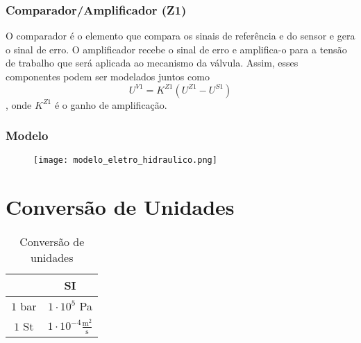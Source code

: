 \documentclass[a4paper]{report}
\begin{document}
\subsubsection*{Comparador/Amplificador (Z1)}

O comparador é o elemento que compara os sinais de referência e do sensor e gera o sinal de erro. O amplificador recebe o sinal de erro e amplifica-o para a tensão de trabalho que será aplicada ao mecanismo da válvula. Assim, esses componentes podem ser modelados juntos como \[
U^{V 1} = K^{Z 1}\left( U^{Z 1} - U^{S 1} \right) 
\], onde $K^{Z 1}$ é o ganho de amplificação.

\subsubsection*{Modelo}

\begin{figure}[H]
    \centering
    \texttt{[image: modelo\_eletro\_hidraulico.png]}
\end{figure}

\section*{Conversão de Unidades}

\begin{table}[H]
    \centering
    \caption{Conversão de unidades}
    \label{tab:label}
    \begin{tabular}{c | c}
      & SI \\
    \hline
    $1$ bar & $1\cdot 10^{5}$ Pa \\
    $1$ St & $1\cdot 10^{-4} \frac{\text{m}^2}{\text{s}}$ \\
    \end{tabular}
\end{table}
\end{document}
